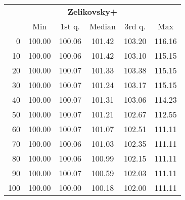 \begin{tabular}{r|ccccc}
  \multicolumn{6}{c}{{\bf Zelikovsky+}} \\
  & Min & 1st q. & Median & 3rd q. & Max \\ \hline\hline
  0 & 100.00 & 100.06 & 101.42 & 103.20 & 116.16
\\ 10 & 100.00 & 100.06 & 101.42 & 103.10 & 115.15
\\ 20 & 100.00 & 100.07 & 101.33 & 103.38 & 115.15
\\ 30 & 100.00 & 100.07 & 101.24 & 103.17 & 115.15
\\ 40 & 100.00 & 100.07 & 101.31 & 103.06 & 114.23
\\ 50 & 100.00 & 100.07 & 101.21 & 102.67 & 112.55
\\ 60 & 100.00 & 100.07 & 101.07 & 102.51 & 111.11
\\ 70 & 100.00 & 100.06 & 101.03 & 102.35 & 111.11
\\ 80 & 100.00 & 100.06 & 100.99 & 102.15 & 111.11
\\ 90 & 100.00 & 100.07 & 100.59 & 102.03 & 111.11
\\ 100 & 100.00 & 100.00 & 100.18 & 102.00 & 111.11
\end{tabular}
